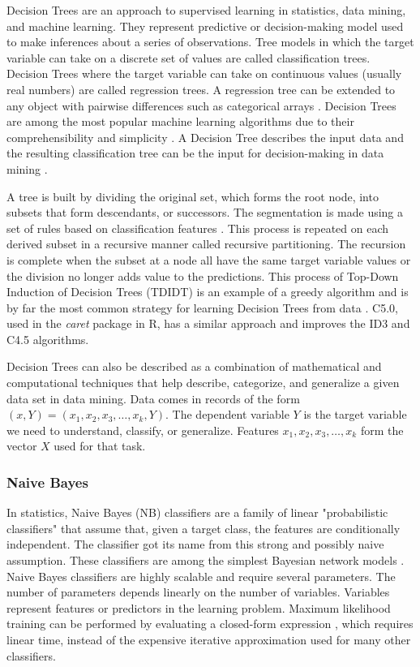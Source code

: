 \documentclass[sn-mathphys-num]{sn-jnl}%
\begin{document}
Decision Trees are an approach to supervised learning in statistics, data mining, and machine learning. They represent predictive or decision-making model used to make inferences about a series of observations. Tree models in which the target variable can take on a discrete set of values are called classification trees. Decision Trees where the target variable can take on continuous values (usually real numbers) are called regression trees. A regression tree can be extended to any object with pairwise differences such as categorical arrays \cite{Studer2011}. Decision Trees are among the most popular machine learning algorithms due to their comprehensibility and simplicity \cite{Wu2008}. A Decision Tree describes the input data and the resulting classification tree can be the input for decision-making in data mining \cite{Rokach2014}.

A tree is built by dividing the original set, which forms the root node, into subsets that form descendants, or successors. The segmentation is made using a set of rules based on classification features \cite{ShalevShwartz2014}. This process is repeated on each derived subset in a recursive manner called recursive partitioning. The recursion is complete when the subset at a node all have the same target variable values or the division no longer adds value to the predictions. This process of Top-Down Induction of Decision Trees (TDIDT) \cite{Quinlan1986} is an example of a greedy algorithm and is by far the most common strategy for learning Decision Trees from data \cite{Rokach2005}. C5.0, used in the \textit{caret} package in R, has a similar approach and improves the ID3 and C4.5 algorithms.

Decision Trees can also be described as a combination of mathematical and computational techniques that help describe, categorize, and generalize a given data set in data mining. Data comes in records of the form $(x, Y) = (x_{1}, x_{2}, x_{3}, \ldots, x_{k}, Y)$. The dependent variable $Y$ is the target variable we need to understand, classify, or generalize. Features $x_{1}, x_{2}, x_{3}, \ldots, x_{k}$ form the vector $X$ used for that task.

\subsubsection{Naive Bayes}

In statistics, Naive Bayes (NB) classifiers are a family of linear "probabilistic classifiers" that assume that, given a target class, the features are conditionally independent. The classifier got its name from this strong and possibly naive assumption. These classifiers are among the simplest Bayesian network models \cite{McCallum2011}. Naive Bayes classifiers are highly scalable and require several parameters. The number of parameters depends linearly on the number of variables. Variables represent features or predictors in the learning problem. Maximum likelihood training can be performed by evaluating a closed-form expression \cite{Russell1999}, which requires linear time, instead of the expensive iterative approximation used for many other classifiers.
\end{document}
